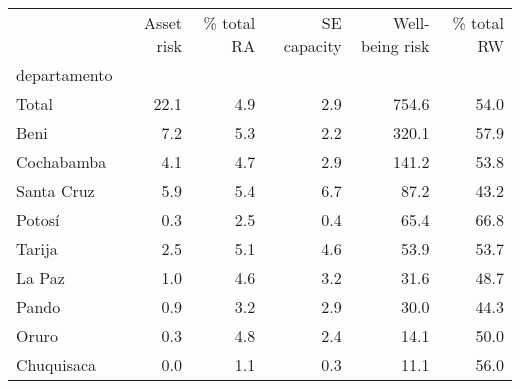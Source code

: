 \begin{tabular}{lrrrrr}
\toprule
{} &  Asset risk &  \% total RA &  SE capacity &  Well-being risk &  \% total RW \\
departamento &             &             &              &                  &             \\
\midrule
Total        &        22.1 &         4.9 &          2.9 &            754.6 &        54.0 \\
Beni         &         7.2 &         5.3 &          2.2 &            320.1 &        57.9 \\
Cochabamba   &         4.1 &         4.7 &          2.9 &            141.2 &        53.8 \\
Santa Cruz   &         5.9 &         5.4 &          6.7 &             87.2 &        43.2 \\
Potosí       &         0.3 &         2.5 &          0.4 &             65.4 &        66.8 \\
Tarija       &         2.5 &         5.1 &          4.6 &             53.9 &        53.7 \\
La Paz       &         1.0 &         4.6 &          3.2 &             31.6 &        48.7 \\
Pando        &         0.9 &         3.2 &          2.9 &             30.0 &        44.3 \\
Oruro        &         0.3 &         4.8 &          2.4 &             14.1 &        50.0 \\
Chuquisaca   &         0.0 &         1.1 &          0.3 &             11.1 &        56.0 \\
\bottomrule
\end{tabular}
